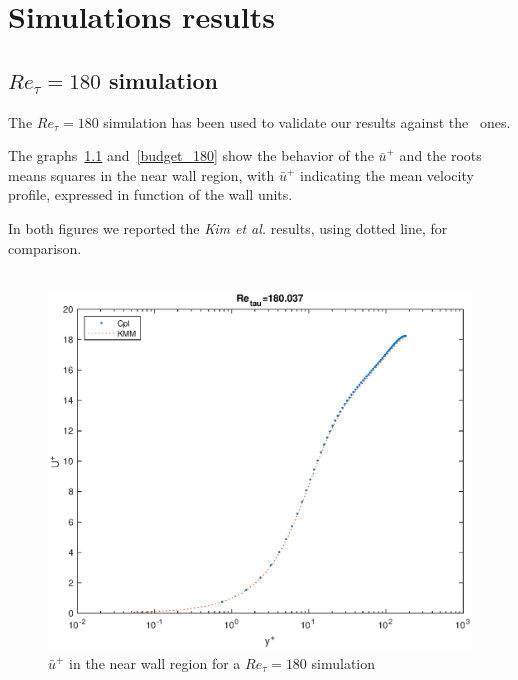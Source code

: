 \chapter{Simulations results}
\section{$Re_{\tau}=180$ simulation}

The $Re_{\tau}=180$ simulation has been used to validate our results against the~\cite{kim_moin_moser} ones. \par
The graphs~\ref{loglaw_180} and~\ref{budget_180} show the behavior of the $\bar{u}^{+}$ and the roots means squares in the near wall region, with $\bar{u}^{+}$ indicating the mean velocity profile, expressed in function of the wall units. \par
In both figures we reported the \emph{Kim et al.} results, using dotted line, for comparison. \\~\par

\begin{figure}
\begin{center}
\includegraphics[scale=0.55]{grafici/loglaw_180.eps}
\caption{$\bar{u}^{+}$ in the near wall region for a $Re_{\tau}=180$ simulation}
\label{loglaw_180}
\end{center} 
\end{figure}

